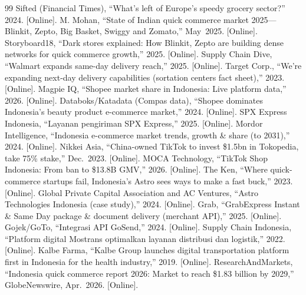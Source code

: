 \documentclass[10pt,twocolumn,letterpaper]{article}
\theoremstyle{definition}
\begin{document}
\begin{thebibliography}{99}
 Sifted (Financial Times), ``What's left of Europe's speedy grocery sector?'' 2024. [Online].
 M. Mohan, ``State of Indian quick commerce market 2025---Blinkit, Zepto, Big Basket, Swiggy and Zomato,'' May~2025. [Online].
 Storyboard18, ``Dark stores explained: How Blinkit, Zepto are building dense networks for quick commerce growth,'' 2025. [Online].
 Supply Chain Dive, ``Walmart expands same-day delivery reach,'' 2025. [Online].
 Target Corp., ``We're expanding next-day delivery capabilities (sortation centers fact sheet),'' 2023. [Online].
 Magpie IQ, ``Shopee market share in Indonesia: Live platform data,'' 2026. [Online].
 Databoks/Katadata (Compas data), ``Shopee dominates Indonesia's beauty product e-commerce market,'' 2024. [Online].
 SPX Express Indonesia, ``Layanan pengiriman SPX Express,'' 2025. [Online].
 Mordor Intelligence, ``Indonesia e-commerce market trends, growth \& share (to 2031),'' 2024. [Online].
 Nikkei Asia, ``China-owned TikTok to invest \$1.5bn in Tokopedia, take 75\% stake,'' Dec.~2023. [Online].
 MOCA Technology, ``TikTok Shop Indonesia: From ban to \$13.8B GMV,'' 2026. [Online].
 The Ken, ``Where quick-commerce startups fail, Indonesia's Astro sees ways to make a fast buck,'' 2023. [Online].
 Global Private Capital Association and AC Ventures, ``Astro Technologies Indonesia (case study),'' 2024. [Online].
 Grab, ``GrabExpress Instant \& Same Day package \& document delivery (merchant API),'' 2025. [Online].
 Gojek/GoTo, ``Integrasi API GoSend,'' 2024. [Online].
 Supply Chain Indonesia, ``Platform digital Mostrans optimalkan layanan distribusi dan logistik,'' 2022. [Online].
 Kalbe Farma, ``Kalbe Group launches digital transportation platform first in Indonesia for the health industry,'' 2019. [Online].
 ResearchAndMarkets, ``Indonesia quick commerce report 2026: Market to reach \$1.83 billion by 2029,'' GlobeNewswire, Apr.~2026. [Online].


\end{thebibliography}
\end{document}
